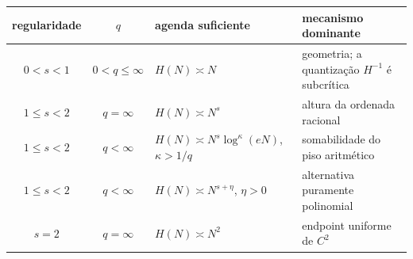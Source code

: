 \begin{tabularx}{\linewidth}{@{}cclX@{}}
\toprule
regularidade & $q$ & agenda suficiente & mecanismo dominante\\
\midrule
$0<s<1$ & $0<q\le\infty$ & $H(N)\asymp N$ & geometria; a quantização $H^{-1}$ é subcrítica\\
$1\le s<2$ & $q=\infty$ & $H(N)\asymp N^s$ & altura da ordenada racional\\
$1\le s<2$ & $q<\infty$ & $H(N)\asymp N^s\log^\kappa(eN)$, $\kappa>1/q$ & somabilidade do piso aritmético\\
$1\le s<2$ & $q<\infty$ & $H(N)\asymp N^{s+\eta}$, $\eta>0$ & alternativa puramente polinomial\\
$s=2$ & $q=\infty$ & $H(N)\asymp N^2$ & endpoint uniforme de $C^2$\\
\bottomrule
\end{tabularx}
